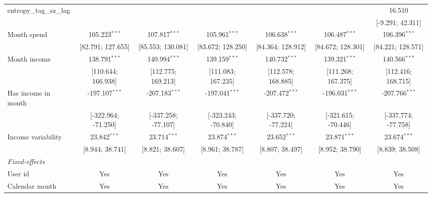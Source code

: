 \begin{table}[htbp]
\begin{threeparttable}[b]
\begin{tabular}{lcccccc}
         entropy\_tag\_sz\_lag            &                     &                     &                     &                     &                     & 16.510\\   
                                          &                     &                     &                     &                     &                     & [-9.291; 42.311]\\   
         Month spend                      & 105.223$^{***}$     & 107.817$^{***}$     & 105.961$^{***}$     & 106.638$^{***}$     & 106.487$^{***}$     & 106.396$^{***}$\\   
                                          & [82.791; 127.655]   & [85.553; 130.081]   & [83.672; 128.250]   & [84.364; 128.912]   & [84.672; 128.301]   & [84.221; 128.571]\\   
         Month income                     & 138.791$^{***}$     & 140.994$^{***}$     & 139.159$^{***}$     & 140.732$^{***}$     & 139.321$^{***}$     & 140.566$^{***}$\\   
                                          & [110.644; 166.938]  & [112.775; 169.213]  & [111.083; 167.235]  & [112.578; 168.885]  & [111.268; 167.375]  & [112.416; 168.715]\\   
         Has income in month              & -197.107$^{***}$    & -207.183$^{***}$    & -197.041$^{***}$    & -207.472$^{***}$    & -196.031$^{***}$    & -207.766$^{***}$\\   
                                          & [-322.964; -71.250] & [-337.258; -77.107] & [-323.243; -70.840] & [-337.720; -77.224] & [-321.615; -70.446] & [-337.774; -77.758]\\   
         Income variability               & 23.842$^{***}$      & 23.714$^{***}$      & 23.874$^{***}$      & 23.652$^{***}$      & 23.871$^{***}$      & 23.674$^{***}$\\   
                                          & [8.944; 38.741]     & [8.821; 38.607]     & [8.961; 38.787]     & [8.807; 38.497]     & [8.952; 38.790]     & [8.839; 38.508]\\   
         \midrule
         \emph{Fixed-effects}\\
         User id                          & Yes                 & Yes                 & Yes                 & Yes                 & Yes                 & Yes\\  
         Calendar month                   & Yes                 & Yes                 & Yes                 & Yes                 & Yes                 & Yes\\  

\end{tabular}
\end{threeparttable}
\end{table}
